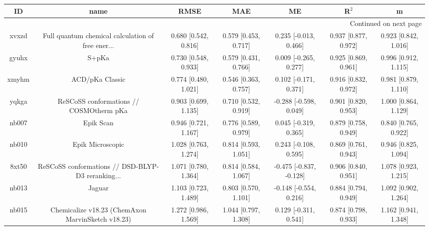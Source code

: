 \documentclass{article}
\begin{document}
\begin{center}
\begin{longtable}{|ccccccc|}
\toprule
    ID &                                               name &                  RMSE &                   MAE &                       ME &                 R$^2$ &                      m \\
\midrule
\endhead
\midrule
\multicolumn{7}{r}{{Continued on next page}} \\
\midrule
\endfoot

\bottomrule
\endlastfoot
 xvxzd &  Full quantum chemical calculation of free ener... &  0.680 [0.542, 0.816] &  0.579 [0.453, 0.717] &    0.235 [-0.013, 0.466] &  0.937 [0.877, 0.972] &   0.923 [0.842, 1.016] \\
 gyuhx &                                              S+pKa &  0.730 [0.548, 0.933] &  0.579 [0.431, 0.766] &    0.009 [-0.265, 0.277] &  0.925 [0.869, 0.961] &   0.996 [0.912, 1.115] \\
 xmyhm &                                    ACD/pKa Classic &  0.774 [0.480, 1.021] &  0.546 [0.363, 0.757] &    0.102 [-0.171, 0.371] &  0.916 [0.832, 0.972] &   0.981 [0.879, 1.110] \\
 yqkga &            ReSCoSS conformations // COSMOtherm pKa &  0.903 [0.699, 1.135] &  0.710 [0.532, 0.919] &   -0.288 [-0.598, 0.049] &  0.901 [0.820, 0.953] &   1.000 [0.864, 1.129] \\
 nb007 &                                          Epik Scan &  0.946 [0.721, 1.167] &  0.776 [0.589, 0.979] &    0.045 [-0.319, 0.365] &  0.879 [0.758, 0.949] &   0.840 [0.765, 0.922] \\
 nb010 &                                   Epik Microscopic &  1.028 [0.763, 1.274] &  0.814 [0.593, 1.051] &    0.243 [-0.108, 0.595] &  0.869 [0.761, 0.943] &   0.946 [0.825, 1.094] \\
 8xt50 &  ReSCoSS conformations // DSD-BLYP-D3 reranking... &  1.071 [0.780, 1.364] &  0.814 [0.584, 1.067] &  -0.475 [-0.837, -0.128] &  0.906 [0.840, 0.951] &   1.078 [0.923, 1.215] \\
 nb013 &                                             Jaguar &  1.103 [0.723, 1.489] &  0.803 [0.570, 1.101] &   -0.148 [-0.554, 0.216] &  0.884 [0.794, 0.949] &   1.092 [0.902, 1.264] \\
 nb015 &  Chemicalize v18.23 (ChemAxon MarvinSketch v18.23) &  1.272 [0.986, 1.569] &  1.044 [0.797, 1.308] &    0.129 [-0.311, 0.541] &  0.874 [0.798, 0.933] &   1.162 [0.941, 1.348] \\

\end{longtable}
\end{center}
\end{document}
